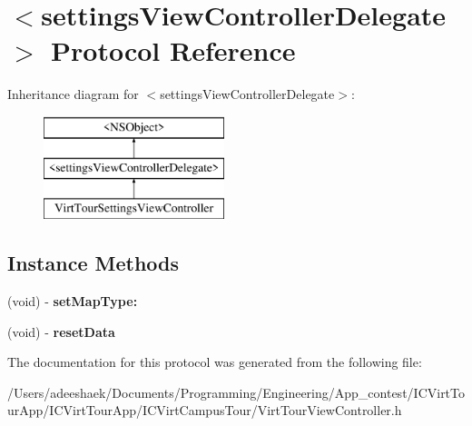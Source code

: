 \hypertarget{protocolsettings_view_controller_delegate-p}{\section{$<$settings\-View\-Controller\-Delegate$>$ Protocol Reference}
\label{protocolsettings_view_controller_delegate-p}
}
Inheritance diagram for $<$settings\-View\-Controller\-Delegate$>$\-:\begin{figure}[H]
\begin{center}
\leavevmode
\includegraphics[height=3.000000cm]{protocolsettings_view_controller_delegate-p}
\end{center}
\end{figure}
\subsection*{Instance Methods}
\begin{DoxyCompactItemize}
\item 
\hypertarget{protocolsettings_view_controller_delegate-p_ad077ea4c02d3acf879ee0d42442813c4}{(void) -\/ {\bfseries set\-Map\-Type\-:}}\label{protocolsettings_view_controller_delegate-p_ad077ea4c02d3acf879ee0d42442813c4}

\item 
\hypertarget{protocolsettings_view_controller_delegate-p_ab51301d11ddc80165b3b7798b866421e}{(void) -\/ {\bfseries reset\-Data}}\label{protocolsettings_view_controller_delegate-p_ab51301d11ddc80165b3b7798b866421e}

\end{DoxyCompactItemize}


The documentation for this protocol was generated from the following file\-:\begin{DoxyCompactItemize}
\item 
/\-Users/adeeshaek/\-Documents/\-Programming/\-Engineering/\-App\-\_\-contest/\-I\-C\-Virt\-Tour\-App/\-I\-C\-Virt\-Tour\-App/\-I\-C\-Virt\-Campus\-Tour/Virt\-Tour\-View\-Controller.\-h\end{DoxyCompactItemize}
